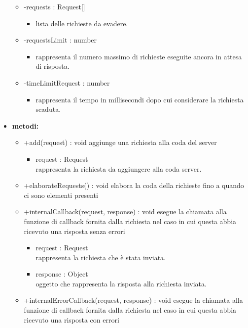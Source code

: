 \begin{itemize}
\begin{itemize}
		\item -requests : Request[]\begin{itemize}
			\item lista delle richieste da evadere.\end{itemize}
		\item -requestsLimit : number\begin{itemize}
			\item rappresenta il numero massimo di richieste eseguite ancora in attesa di risposta.\end{itemize}
		\item -timeLimitRequest : number\begin{itemize}
			\item rappresenta il tempo in millisecondi dopo cui considerare la richiesta scaduta.\end{itemize}
	\end{itemize}
	\item \textbf{metodi:}
	\begin{itemize}
		\item +add(request) : void\newline
		aggiunge una richiesta alla coda del server
		\begin{itemize}
			\item request : Request\\
			rappresenta la richiesta da aggiungere alla coda server.
		\end{itemize}
		\item +elaborateRequests() : void\newline
		elabora la coda della richieste fino a quando ci sono elementi presenti
		\item +internalCallback(request, response) : void\newline
		esegue la chiamata alla funzione di callback fornita dalla richiesta nel caso in cui questa abbia ricevuto una risposta senza errori
		\begin{itemize}
			\item request : Request\\
			rappresenta la richiesta che è stata inviata.
			\item response : Object\\
			oggetto che rappresenta la risposta alla richiesta inviata.
		\end{itemize}
		\item +internalErrorCallback(request, response) : void\newline
		esegue la chiamata alla funzione di callback fornita dalla richiesta nel caso in cui questa abbia ricevuto una risposta con errori

\end{itemize}
\end{itemize}
